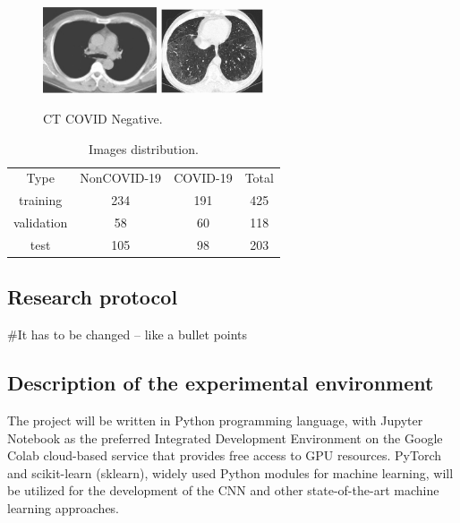 \documentclass[runningheads]{llncs}
\begin{document}
\begin{figure}[h]
\centering
{
\includegraphics[width=0.30\textwidth]{imagesDatasetSection/noncovid1.jpg}
}
\quad
{
\includegraphics[width=0.27\textwidth]{imagesDatasetSection/noncovid2.jpg}
}
\label{covidNegative}
\caption{CT COVID Negative.}
\end{figure}

\begin{table}[h]
\label{imageDistributionAuthors}
\centering
\caption{Images distribution.}
\begin{tabular}{c|c|c|c}
\cline{1-4}
Type & NonCOVID-19 & COVID-19 & Total \\ \cline{1-4}
training & 234 & 191 & 425\\ \cline{1-4}
validation & 58 & 60 & 118\\ \cline{1-4}
test & 105  & 98 & 203\\ \cline{1-4}
\end{tabular}
\end{table} 


\subsection{Research protocol}
#It has to be changed -- like a bullet points

\subsection{Description of the experimental environment}
The project will be written in Python programming language, with Jupyter Notebook as the preferred Integrated Development Environment on the Google Colab cloud-based service that provides free access to GPU resources. PyTorch and scikit-learn (sklearn), widely used Python modules for machine learning, will be utilized for the development of the CNN and other state-of-the-art machine learning approaches.
\end{document}
